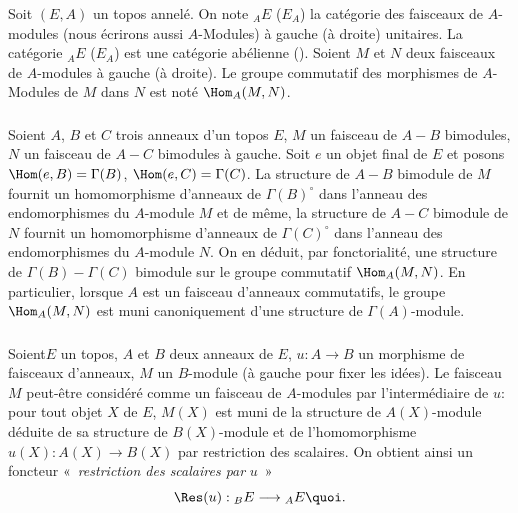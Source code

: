 \subsubsection{}
Soit $(E,A)$ un topos annelé. On note ${}_AE$ (\resp $E_A$) la
catégorie des faisceaux de $A$-modules (nous écrirons aussi
$A$-Modules) à gauche (\resp à droite) unitaires. La catégorie
${}_AE$ (\resp $E_A$) est une catégorie abélienne
(). Soient $M$ et $N$ deux faisceaux de $A$-modules
à gauche (\resp à droite). Le groupe commutatif des morphismes de
$A$-Modules de $M$ dans $N$ est noté $\Hom_A(M,N)$.

\subsubsection{}
Soient $A$, $B$ et $C$ trois anneaux d'un topos $E$, $M$ un faisceau
de $A-B$ bimodules, $N$ un faisceau de $A-C$ bimodules à gauche.
Soit $e$ un objet final de $E$ et posons $\Hom(e,B)=\Gamma(B)$,
$\Hom(e,C)=\Gamma(C)$. La structure de $A-B$ bimodule de $M$ fournit
un homomorphisme d'anneaux de $\Gamma(B)^{\circ}$ dans l'anneau des
endomorphismes du $A$-module $M$ et de même, la structure de $A-C$
bimodule de $N$ fournit un homomorphisme d'anneaux de
$\Gamma(C)^{\circ}$ dans l'anneau des endomorphismes du $A$-module
$N$. On en déduit, par fonctorialité, une structure de
$\Gamma(B)-\Gamma(C)$ bimodule sur le groupe commutatif
$\Hom_A(M,N)$. En particulier, lorsque $A$ est un faisceau d'anneaux
commutatifs, le groupe $\Hom_A(M,N)$ est muni canoniquement d'une
structure de $\Gamma(A)$-module.

\subsubsection{}
Soient\pageoriginale $E$ un topos, $A$ et $B$ deux anneaux de $E$,
$u:A\rightarrow B$ un morphisme de faisceaux d'anneaux, $M$ un
$B$-module (à gauche pour fixer les idées). Le faisceau $M$
peut-être considéré comme un faisceau de $A$-modules par
l'intermédiaire de $u$: pour tout objet $X$ de $E$, $M(X)$ est muni
de la structure de $A(X)$-module déduite de sa structure de
$B(X)$-module et de l'homomorphisme $u(X):A(X)\rightarrow B(X)$ par
restriction des scalaires. On obtient ainsi un foncteur « \emph{restriction des scalaires par} $u$ »
$$
\Res(u):{}_BE\longrightarrow {}_AE{\quoi}.
$$

